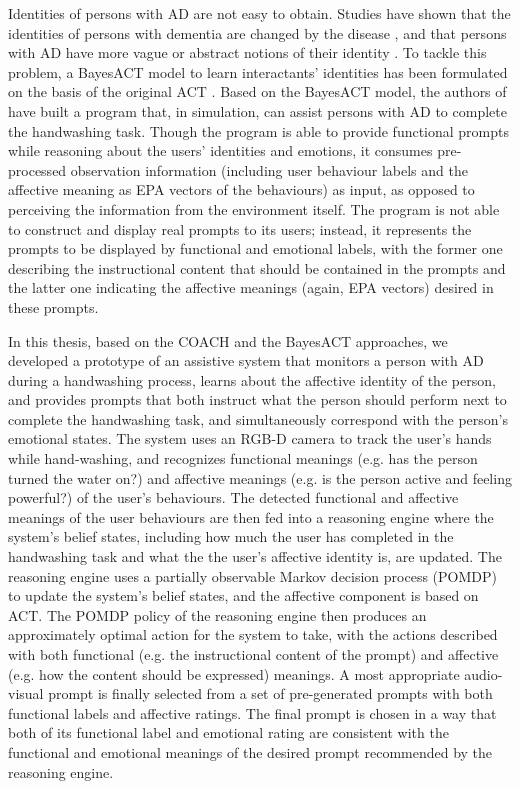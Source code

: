 Identities of persons with AD are not easy to obtain. Studies have shown that the identities of persons with dementia are changed by the disease \cite{orona1990temporality}, and that persons with AD have more vague or abstract notions of their identity \cite{rose2004memory}. To tackle this problem, a BayesACT model to learn interactants' identities has been formulated on the basis of the original ACT \cite{hoey2013bayesian}. Based on the BayesACT model, the authors of \cite{hoey2013bayesian} have built a program that, in simulation, can assist persons with AD to complete the handwashing task. Though the program is able to provide functional prompts while reasoning about the users' identities and emotions, it consumes pre-processed observation information (including user behaviour labels and the affective meaning as EPA vectors of the behaviours) as input, as opposed to perceiving the information from the environment itself. The program is not able to construct and display real prompts to its users; instead, it represents the prompts to be displayed by functional and emotional labels, with the former one describing the instructional content that should be contained in the prompts and the latter one indicating the affective meanings  (again, EPA vectors) desired in these prompts.

In this thesis, based on the COACH and the BayesACT approaches, we developed a prototype of an assistive system that monitors a person with AD during a handwashing process, learns about the affective identity of the person, and provides prompts that both instruct what the person should perform next to complete the handwashing task, and simultaneously correspond with the person's emotional states. The system uses an RGB-D camera to track the user's hands while hand-washing, and recognizes functional meanings (e.g. has the person turned the water on?) and affective meanings (e.g. is the person active and feeling powerful?) of the user's behaviours. The detected functional and affective meanings of the user behaviours are then fed into a reasoning engine where the system's belief states, including how much the user has completed in the handwashing task and what the the user's affective identity is, are updated. The reasoning engine uses a partially observable Markov decision process (POMDP) to update the system's belief states, and the affective component is based on ACT. The POMDP policy of the reasoning engine then produces an approximately optimal action for the system to take, with the actions described with both functional (e.g. the instructional content of the prompt) and affective (e.g. how the content should be expressed) meanings. A most appropriate audio-visual prompt is finally selected from a set of pre-generated prompts with both functional labels and affective ratings. The final prompt is chosen in a way that both of its functional label and emotional rating are consistent with the functional and emotional meanings of the desired prompt recommended by the reasoning engine.

